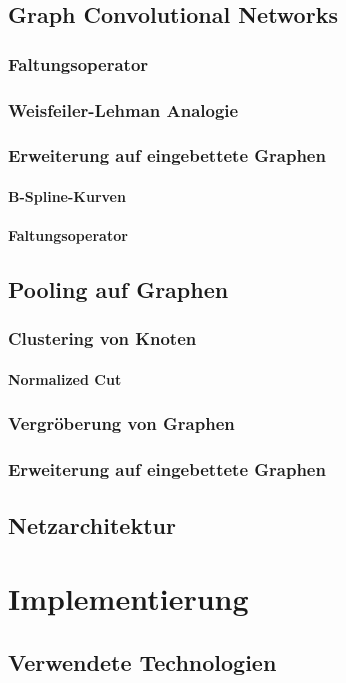 \section{Graph Convolutional Networks}
\subsection{Faltungsoperator}
\subsection{Weisfeiler-Lehman Analogie}
\subsection{Erweiterung auf eingebettete Graphen}
\subsubsection{B-Spline-Kurven}
\subsubsection{Faltungsoperator}
\section{Pooling auf Graphen}
\subsection{Clustering von Knoten}
\subsubsection{Normalized Cut}
\subsection{Vergröberung von Graphen}
\subsection{Erweiterung auf eingebettete Graphen}
\section{Netzarchitektur}

\chapter{Implementierung}
\section{Verwendete Technologien}
